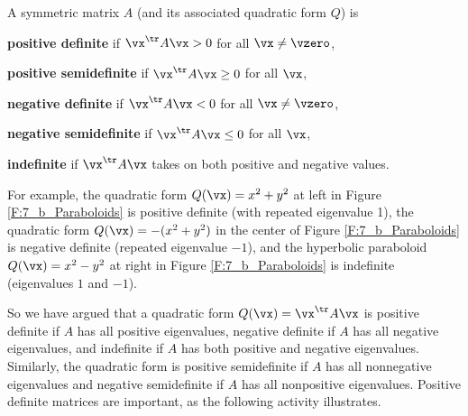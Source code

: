 \begin{definition} \label{def:7_4_definite} A symmetric matrix $A$ (and its associated quadratic form $Q$) is
\ba
\item \textbf{positive definite} if $\vx^{\tr}A\vx > 0$ for all $\vx \neq \vzero$,
\item \textbf{positive semidefinite} if $\vx^{\tr}A\vx \geq 0$ for all $\vx$,
\item \textbf{negative definite} if $\vx^{\tr}A\vx < 0$ for all $\vx \neq \vzero$,
\item \textbf{negative semidefinite} if $\vx^{\tr}A\vx \leq 0$ for all $\vx$,
\item \textbf{indefinite} if $\vx^{\tr}A\vx$ takes on both positive and negative values.
\ea
\end{definition}

For example, the quadratic form $Q(\vx) = x^2+y^2$ at left in Figure \ref{F:7_b_Paraboloids} is positive definite (with repeated eigenvalue 1), the quadratic form $Q(\vx) = -(x^2+y^2)$ in the center of Figure \ref{F:7_b_Paraboloids} is negative definite (repeated eigenvalue $-1$), and the hyperbolic paraboloid $Q(\vx) = x^2-y^2$ at right in Figure \ref{F:7_b_Paraboloids} is indefinite (eigenvalues $1$ and $-1$). 

So we have argued that a quadratic form $Q(\vx) = \vx^{\tr} A \vx$ is positive definite if $A$ has all positive eigenvalues, negative definite if $A$ has all negative eigenvalues, and indefinite if $A$ has both positive and negative eigenvalues. Similarly, the quadratic form is positive semidefinite if $A$ has all nonnegative eigenvalues and negative semidefinite if $A$ has all nonpositive eigenvalues. Positive definite matrices are important, as the following activity illustrates.


